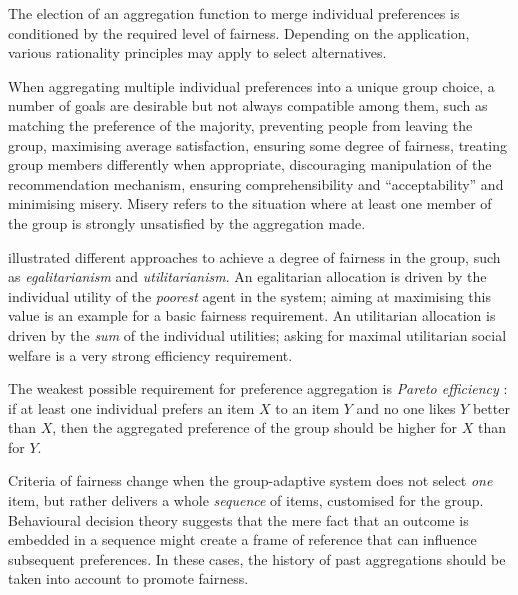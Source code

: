 

The election of an aggregation function to merge individual preferences is conditioned by the required level of fairness.  
Depending on the application, various rationality principles may apply to select alternatives.

When aggregating multiple individual preferences into a unique group choice, a number of goals are desirable but not always compatible among them, such as matching the preference of the majority, preventing people from leaving the group, maximising average satisfaction, ensuring some degree of fairness, treating group members differently when appropriate, discouraging manipulation of the recommendation mechanism, ensuring comprehensibility and ``acceptability'' \cite{Jameson07b} and minimising misery.
Misery refers to the situation where at least one member of the group is strongly unsatisfied by the aggregation made.

\citet{Chevaleyre07} illustrated different approaches to achieve a degree of fairness in the group, such as \emph{egalitarianism} and \emph{utilitarianism}. 
An egalitarian allocation is driven by the individual utility of the \emph{poorest} agent in the system; aiming at maximising this value is an example for a basic fairness requirement.
An utilitarian allocation is driven by the \emph{sum} of the individual utilities; asking for maximal utilitarian social welfare is a very strong efficiency requirement. 

The weakest possible requirement for preference aggregation is \emph{Pareto efficiency} \cite{Grabisch98}: if at least one individual prefers an item $X$ to an item $Y$ and no one likes $Y$ better than $X$, then the aggregated preference of the group should be higher for $X$ than for $Y$.

Criteria of fairness change when the group-adaptive system does not select \emph{one} item, but rather delivers a whole \emph{sequence} of items, customised for the group.
Behavioural decision theory \cite{Novemsky05} suggests that the mere fact that an outcome is embedded in a sequence might create a frame of reference that can influence subsequent preferences.
In these cases, the history of past aggregations should be taken into account to promote fairness. 

